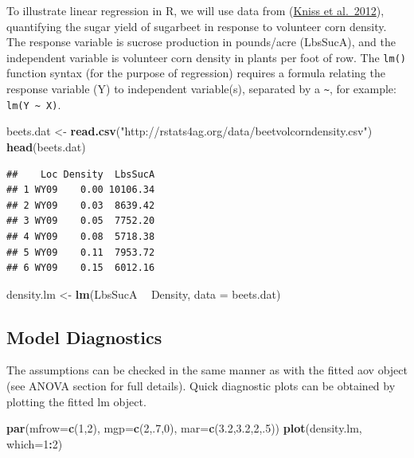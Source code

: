 \documentclass[letterpaper,]{book}
\newenvironment{Shaded}{\begin{snugshade}}{\end{snugshade}}
\newcommand{\DataTypeTok}[1]{\textcolor[rgb]{0.13,0.29,0.53}{#1}}
\newcommand{\DecValTok}[1]{\textcolor[rgb]{0.00,0.00,0.81}{#1}}
\newcommand{\FloatTok}[1]{\textcolor[rgb]{0.00,0.00,0.81}{#1}}
\newcommand{\KeywordTok}[1]{\textcolor[rgb]{0.13,0.29,0.53}{\textbf{#1}}}
\newcommand{\NormalTok}[1]{#1}
\newcommand{\OperatorTok}[1]{\textcolor[rgb]{0.81,0.36,0.00}{\textbf{#1}}}
\newcommand{\StringTok}[1]{\textcolor[rgb]{0.31,0.60,0.02}{#1}}
\begin{document}
To illustrate linear regression in R, we will use data from (\href{http://www.bioone.org/doi/abs/10.1614/WT-D-11-00125.1}{Kniss et al.~2012}), quantifying the sugar yield of sugarbeet in response to volunteer corn density. The response variable is sucrose production in pounds/acre (LbsSucA), and the independent variable is volunteer corn density in plants per foot of row. The \texttt{lm()} function syntax (for the purpose of regression) requires a formula relating the response variable (Y) to independent variable(s), separated by a \texttt{\textasciitilde{}}, for example: \texttt{lm(Y\ \textasciitilde{}\ X)}.

\begin{Shaded}
\begin{Highlighting}[]
\NormalTok{beets.dat <-}\StringTok{ }\KeywordTok{read.csv}\NormalTok{(}\StringTok{"http://rstats4ag.org/data/beetvolcorndensity.csv"}\NormalTok{)}
\KeywordTok{head}\NormalTok{(beets.dat)}
\end{Highlighting}
\end{Shaded}

\begin{verbatim}
##    Loc Density  LbsSucA
## 1 WY09    0.00 10106.34
## 2 WY09    0.03  8639.42
## 3 WY09    0.05  7752.20
## 4 WY09    0.08  5718.38
## 5 WY09    0.11  7953.72
## 6 WY09    0.15  6012.16
\end{verbatim}

\begin{Shaded}
\begin{Highlighting}[]
\NormalTok{density.lm <-}\StringTok{ }\KeywordTok{lm}\NormalTok{(LbsSucA }\OperatorTok{~}\StringTok{ }\NormalTok{Density, }\DataTypeTok{data =}\NormalTok{ beets.dat)}
\end{Highlighting}
\end{Shaded}

\hypertarget{model-diagnostics}{%
\subsection{Model Diagnostics}\label{model-diagnostics}}

The assumptions can be checked in the same manner as with the fitted aov object (see ANOVA section for full details). Quick diagnostic plots can be obtained by plotting the fitted lm object.



\begin{Shaded}
\begin{Highlighting}[]
\KeywordTok{par}\NormalTok{(}\DataTypeTok{mfrow=}\KeywordTok{c}\NormalTok{(}\DecValTok{1}\NormalTok{,}\DecValTok{2}\NormalTok{), }\DataTypeTok{mgp=}\KeywordTok{c}\NormalTok{(}\DecValTok{2}\NormalTok{,.}\DecValTok{7}\NormalTok{,}\DecValTok{0}\NormalTok{), }\DataTypeTok{mar=}\KeywordTok{c}\NormalTok{(}\FloatTok{3.2}\NormalTok{,}\FloatTok{3.2}\NormalTok{,}\DecValTok{2}\NormalTok{,.}\DecValTok{5}\NormalTok{))}
\KeywordTok{plot}\NormalTok{(density.lm, }\DataTypeTok{which=}\DecValTok{1}\OperatorTok{:}\DecValTok{2}\NormalTok{)}
\end{Highlighting}
\end{Shaded}
\end{document}
